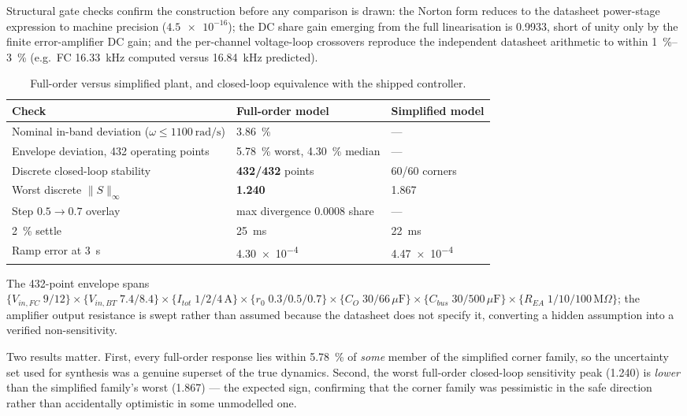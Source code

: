 Structural gate checks confirm the construction before any comparison is drawn: the
Norton form reduces to the datasheet power-stage expression to machine precision
($\num{4.5e-16}$); the DC share gain emerging from the full linearisation is \num{0.9933},
short of unity only by the finite error-amplifier DC gain; and the per-channel voltage-loop
crossovers reproduce the independent datasheet arithmetic to within \SIrange{1}{3}{\percent}
(e.g.\ FC \SI{16.33}{\kilo\hertz} computed versus \SI{16.84}{\kilo\hertz} predicted).

\begin{table}[H]
\caption{Full-order versus simplified plant, and closed-loop equivalence with the shipped
controller.}
\label{tab:fullorder}
\begin{tabular}{lll}
\toprule
\textbf{Check} & \textbf{Full-order model} & \textbf{Simplified model}\\
\midrule
Nominal in-band deviation ($\omega\le\SI{1100}{\radian\per\second}$) & \SI{3.86}{\percent} & --- \\
Envelope deviation, 432 operating points & \SI{5.78}{\percent} worst, \SI{4.30}{\percent} median & ---\\
Discrete closed-loop stability & \textbf{432/432} points & 60/60 corners\\
Worst discrete $\|S\|_\infty$ & \textbf{\num{1.240}} & \num{1.867}\\
Step $0.5\to0.7$ overlay & max divergence \num{0.0008} share & ---\\
\SI{2}{\percent} settle & \SI{25}{\milli\second} & \SI{22}{\milli\second}\\
Ramp error at \SI{3}{\second} & \num{4.30e-4} & \num{4.47e-4}\\
\bottomrule
\end{tabular}
\end{table}

The 432-point envelope spans $\{V_{in,FC}\;9/12\}\times\{V_{in,BT}\;7.4/8.4\}\times
\{I_{tot}\;1/2/4\,\mathrm{A}\}\times\{r_0\;0.3/0.5/0.7\}\times\{C_O\;30/66\,\mu\mathrm{F}\}
\times\{C_{bus}\;30/500\,\mu\mathrm{F}\}\times\{R_{EA}\;1/10/100\,\mathrm{M}\Omega\}$;
the amplifier output resistance is swept rather than assumed because the datasheet does
not specify it, converting a hidden assumption into a verified non-sensitivity.

Two results matter. First, every full-order response lies within \SI{5.78}{\percent} of
\emph{some} member of the simplified corner family, so the uncertainty set used for
synthesis was a genuine superset of the true dynamics. Second, the worst full-order
closed-loop sensitivity peak (\num{1.240}) is \emph{lower} than the simplified family's
worst (\num{1.867}) --- the expected sign, confirming that the corner family was
pessimistic in the safe direction rather than accidentally optimistic in some unmodelled
one.

